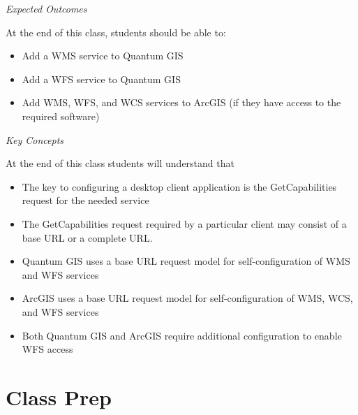 \documentclass[]{book}
\providecommand{\tightlist}{%
  \setlength{\itemsep}{0pt}\setlength{\parskip}{0pt}}
\begin{document}
\emph{Expected Outcomes}

At the end of this class, students should be able to:

\begin{itemize}
\tightlist
\item
  Add a WMS service to Quantum GIS
\item
  Add a WFS service to Quantum GIS
\item
  Add WMS, WFS, and WCS services to ArcGIS (if they have access to the
  required software)
\end{itemize}

\emph{Key Concepts}

At the end of this class students will understand that

\begin{itemize}
\tightlist
\item
  The key to configuring a desktop client application is the
  GetCapabilities request for the needed service
\item
  The GetCapabilities request required by a particular client may
  consist of a base URL or a complete URL.
\item
  Quantum GIS uses a base URL request model for self-configuration of
  WMS and WFS services
\item
  ArcGIS uses a base URL request model for self-configuration of WMS,
  WCS, and WFS services
\item
  Both Quantum GIS and ArcGIS require additional configuration to enable
  WFS access
\end{itemize}

\section{Class Prep}\label{week12-prep}
\end{document}
